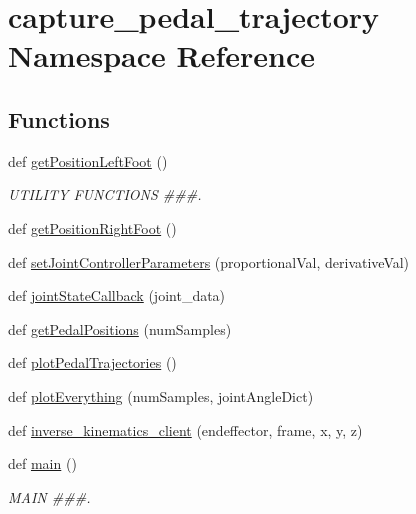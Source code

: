 \hypertarget{namespacecapture__pedal__trajectory}{}\section{capture\+\_\+pedal\+\_\+trajectory Namespace Reference}
\label{namespacecapture__pedal__trajectory}
\subsection*{Functions}
\begin{DoxyCompactItemize}
\item 
def \mbox{\hyperlink{namespacecapture__pedal__trajectory_a8d1d532a39c3c5a5efe8d6110ecd1723}{get\+Position\+Left\+Foot}} ()
\begin{DoxyCompactList}\small\item\em U\+T\+I\+L\+I\+TY F\+U\+N\+C\+T\+I\+O\+NS \#\#\#. \end{DoxyCompactList}\item 
def \mbox{\hyperlink{namespacecapture__pedal__trajectory_abd2b89d215476e10e9079f6f971a669c}{get\+Position\+Right\+Foot}} ()
\item 
def \mbox{\hyperlink{namespacecapture__pedal__trajectory_a00dff2df306072da5d299eba96e79b4b}{set\+Joint\+Controller\+Parameters}} (proportional\+Val, derivative\+Val)
\item 
def \mbox{\hyperlink{namespacecapture__pedal__trajectory_ac931a7ae623a2c8c8df34da551639cce}{joint\+State\+Callback}} (joint\+\_\+data)
\item 
def \mbox{\hyperlink{namespacecapture__pedal__trajectory_a73fc41de533fbb350b426e9c08886203}{get\+Pedal\+Positions}} (num\+Samples)
\item 
def \mbox{\hyperlink{namespacecapture__pedal__trajectory_ab92d9c5ee601a8497311ab922392e027}{plot\+Pedal\+Trajectories}} ()
\item 
def \mbox{\hyperlink{namespacecapture__pedal__trajectory_a54694682225635fb5a735f159e9f059c}{plot\+Everything}} (num\+Samples, joint\+Angle\+Dict)
\item 
def \mbox{\hyperlink{namespacecapture__pedal__trajectory_affbe4020d535c4967511b40d3aef141d}{inverse\+\_\+kinematics\+\_\+client}} (endeffector, frame, x, y, z)
\item 
def \mbox{\hyperlink{namespacecapture__pedal__trajectory_ae43bcee5928a71a9e44c3400a772a161}{main}} ()
\begin{DoxyCompactList}\small\item\em M\+A\+IN \#\#\#. \end{DoxyCompactList}\end{DoxyCompactItemize}
